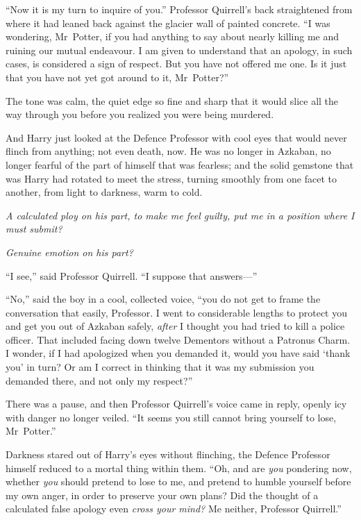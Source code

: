 “Now it is my turn to inquire of you.” Professor Quirrell’s back straightened from where it had leaned back against the glacier wall of painted concrete. “I was wondering, Mr~Potter, if you had anything to say about nearly killing me and ruining our mutual endeavour. I am given to understand that an apology, in such cases, is considered a sign of respect. But you have not offered me one. Is it just that you have not yet got around to it, Mr~Potter?”

The tone was calm, the quiet edge so fine and sharp that it would slice all the way through you before you realized you were being murdered.

And Harry just looked at the Defence Professor with cool eyes that would never flinch from anything; not even death, now. He was no longer in Azkaban, no longer fearful of the part of himself that was fearless; and the solid gemstone that was Harry had rotated to meet the stress, turning smoothly from one facet to another, from light to darkness, warm to cold.

\emph{A calculated ploy on his part, to make me feel guilty, put me in a position where I must submit?}

\emph{Genuine emotion on his part?}

“I see,” said Professor Quirrell. “I suppose that answers—”

“No,” said the boy in a cool, collected voice, “you do not get to frame the conversation that easily, Professor. I went to considerable lengths to protect you and get you out of Azkaban safely, \emph{after} I thought you had tried to kill a police officer. That included facing down twelve Dementors without a Patronus Charm. I wonder, if I had apologized when you demanded it, would you have said ‘thank you’ in turn? Or am I correct in thinking that it was my submission you demanded there, and not only my respect?”

There was a pause, and then Professor Quirrell’s voice came in reply, openly icy with danger no longer veiled. “It seems you still cannot bring yourself to lose, Mr~Potter.”

Darkness stared out of Harry’s eyes without flinching, the Defence Professor himself reduced to a mortal thing within them. “Oh, and are \emph{you} pondering now, whether \emph{you} should pretend to lose to me, and pretend to humble yourself before my own anger, in order to preserve your own plans? Did the thought of a calculated false apology even \emph{cross your mind?} Me neither, Professor Quirrell.”

